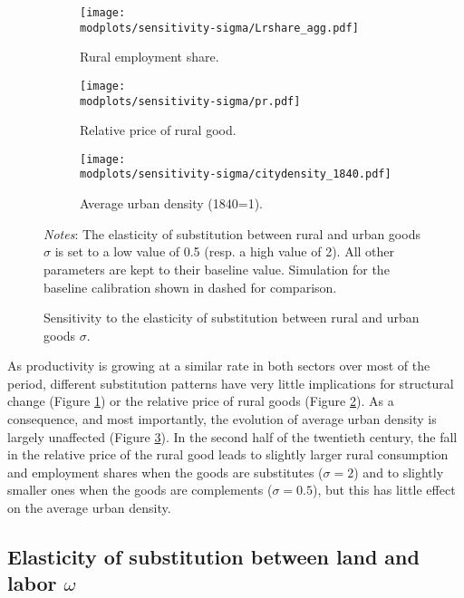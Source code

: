 \documentclass[11pt]{report}
\newcommand{\round}{revision3}  %
\newcommand{\modplots}{../../output/model/plots/\round}
\newcommand{\pthree}{0.37}  %
\begin{document}
\begin{figure}[h!]
	\begin{adjustbox}{center}
		\begin{subfigure}{\pthree\textwidth}
			\texttt{[image: \\modplots/sensitivity-sigma/Lrshare\_agg.pdf]}
			\caption{Rural employment share.\label{B-fig:model-sensi-sigma-Lr}}
		\end{subfigure}
		\begin{subfigure}{\pthree\textwidth}
			\texttt{[image: \\modplots/sensitivity-sigma/pr.pdf]}
			\caption{Relative price of rural good.\label{B-fig:model-sensi-sigma-pr}}
		\end{subfigure}
		\begin{subfigure}{\pthree\textwidth}
			\texttt{[image: \\modplots/sensitivity-sigma/citydensity\_1840.pdf]}
			\caption{Average urban density (1840=1).\label{B-fig:model-sensi-sigma-avgd}}
		\end{subfigure}
	\end{adjustbox}
	\caption{Sensitivity to the elasticity of substitution between rural and urban goods $\sigma$.\label{B-fig:model-sensi-sigma}}
	{\footnotesize \textit{Notes}: The elasticity of substitution between rural and urban goods $\sigma$ is set to a low value of 0.5 (resp. a high value of 2). All other parameters are kept to their baseline value. Simulation for the baseline calibration shown in dashed for comparison.}
\end{figure}

As productivity is growing at a similar rate in both sectors over most of the period, different substitution patterns have very little implications for structural change (Figure \ref{B-fig:model-sensi-sigma-Lr}) or the relative price of rural goods (Figure \ref{B-fig:model-sensi-sigma-pr}). As a consequence, and most importantly, the evolution of average urban density is largely unaffected (Figure \ref{B-fig:model-sensi-sigma-avgd}). In the second half of the twentieth century, the fall in the relative price of the rural good leads to slightly larger rural consumption and employment shares when the goods are substitutes ($\sigma=2$) and to slightly smaller ones when the goods are complements ($\sigma=0.5$), but this has little effect on the average urban density.

\subsection{Elasticity of substitution between land and labor $\omega$}\label{B-sec:omega}
\end{document}
